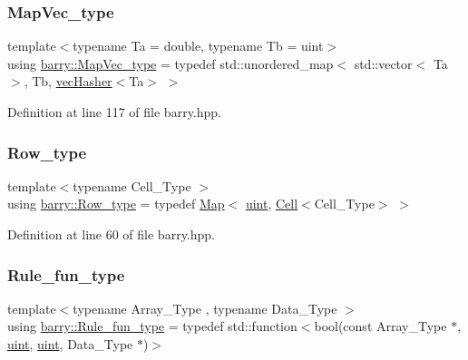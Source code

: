 \mbox{\label{namespacebarry_a2f0d3aab1d67e4c8eaeab9022e16139f}} 
\subsubsection{\texorpdfstring{Map\+Vec\+\_\+type}{MapVec\_type}}
{\footnotesize\ttfamily template$<$typename Ta  = double, typename Tb  = uint$>$ \\
using \hyperlink{namespacebarry_a2f0d3aab1d67e4c8eaeab9022e16139f}{barry\+::\+Map\+Vec\+\_\+type} = typedef std\+::unordered\+\_\+map$<$ std\+::vector$<$ Ta $>$, Tb, \hyperlink{structbarry_1_1vec_hasher}{vec\+Hasher}$<$Ta$>$ $>$}



Definition at line 117 of file barry.\+hpp.

\mbox{\label{namespacebarry_a741876d7060484e80a9f2b9d128d2c8d}} 
\subsubsection{\texorpdfstring{Row\+\_\+type}{Row\_type}}
{\footnotesize\ttfamily template$<$typename Cell\+\_\+\+Type $>$ \\
using \hyperlink{namespacebarry_a741876d7060484e80a9f2b9d128d2c8d}{barry\+::\+Row\+\_\+type} = typedef \hyperlink{namespacebarry_a979a04835a9855ff2054c383c569c89e}{Map}$<$ \hyperlink{namespacebarry_a11dfc53ddb4672278319aa04f1e09a6c}{uint}, \hyperlink{classbarry_1_1_cell}{Cell}$<$Cell\+\_\+\+Type$>$ $>$}



Definition at line 60 of file barry.\+hpp.

\mbox{\label{namespacebarry_aefd7e6d4ba228e2ce1074d075c512178}} 
\subsubsection{\texorpdfstring{Rule\+\_\+fun\+\_\+type}{Rule\_fun\_type}}
{\footnotesize\ttfamily template$<$typename Array\+\_\+\+Type , typename Data\+\_\+\+Type $>$ \\
using \hyperlink{namespacebarry_aefd7e6d4ba228e2ce1074d075c512178}{barry\+::\+Rule\+\_\+fun\+\_\+type} = typedef std\+::function$<$bool(const Array\+\_\+\+Type $\ast$, \hyperlink{namespacebarry_a11dfc53ddb4672278319aa04f1e09a6c}{uint}, \hyperlink{namespacebarry_a11dfc53ddb4672278319aa04f1e09a6c}{uint}, Data\+\_\+\+Type $\ast$)$>$}



